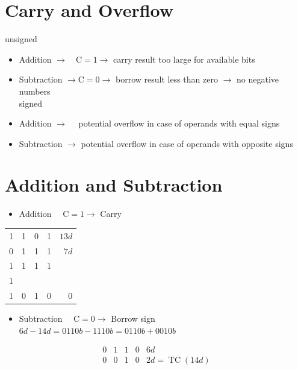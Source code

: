 \section*{Carry and Overflow}
unsigned

\begin{itemize}
  \item Addition $\rightarrow \quad \mathrm{C}=1 \rightarrow$ carry result too large for available bits
  \item Subtraction $\rightarrow \mathrm{C}=0 \rightarrow$ borrow result less than zero $\rightarrow$ no negative numbers\\
signed
  \item Addition $\rightarrow \quad$ potential overflow in case of operands with equal signs
  \item Subtraction $\rightarrow$ potential overflow in case of operands with opposite signs
\end{itemize}

\section*{Addition and Subtraction}
\begin{itemize}
  \item Addition $\quad \mathrm{C}=1 \rightarrow$ Carry
\end{itemize}

\begin{center}
\begin{tabular}{|rrrrr|}
\hline
1 & 1 & 0 & 1 & $13 d$ \\
0 & 1 & 1 & 1 & $7 d$ \\
1 & 1 & 1 & 1 &  \\
1 &  &  &  &  \\
1 & 0 & 1 & 0 & 0 \\
\end{tabular}
\end{center}

\begin{itemize}
  \item Subtraction $\quad \mathrm{C}=0 \rightarrow$ Borrow sign\\
$6 d-14 d=0110 b-1110 b=0110 b+0010 b$
\end{itemize}

$$
\begin{array}{llllll}
0 & 1 & 1 & 0 & 6 d \\
0 & 0 & 1 & 0 & 2 d=\operatorname{TC}(14 d)
\end{array}
$$


